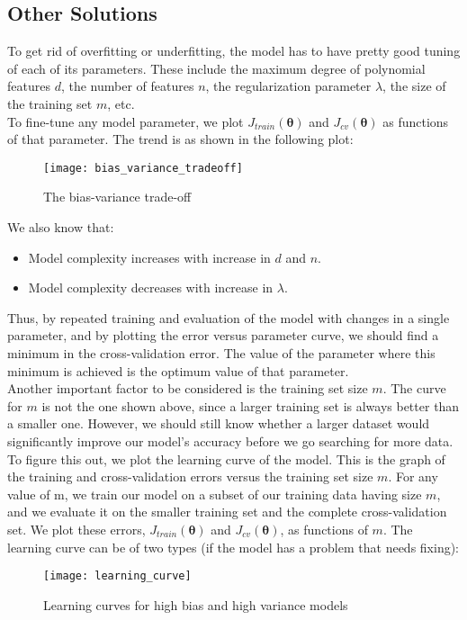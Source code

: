 \documentclass[a4paper, 12pt]{article}
\begin{document}
\subsection{Other Solutions}
To get rid of overfitting or underfitting, the model has to have pretty good tuning of each of its parameters. These include the maximum degree of polynomial features $d$, the number of features $n$, the regularization parameter $\lambda$, the size of the training set $m$, etc. \\
\break
To fine-tune any model parameter, we plot $J_{train}\left(\bm{\theta}\right)$ and $J_{cv}\left(\bm{\theta}\right)$ as functions of that parameter. The trend is as shown in the following plot:
\begin{figure}[H]
\centering
\texttt{[image: bias\_variance\_tradeoff]}
\caption{The bias-variance trade-off}
\end{figure}
We also know that:
\begin{itemize}
\item Model complexity increases with increase in $d$ and $n$.
\item Model complexity decreases with increase in $\lambda$.
\end{itemize}
Thus, by repeated training and evaluation of the model with changes in a single parameter, and by plotting the error versus parameter curve, we should find a minimum in the cross-validation error. The value of the parameter where this minimum is achieved is the optimum value of that parameter. \\
\break
Another important factor to be considered is the training set size $m$. The curve for $m$ is not the one shown above, since a larger training set is always better than a smaller one. However, we should still know whether a larger dataset would significantly improve our model's accuracy before we go searching for more data. \\
\break
To figure this out, we plot the learning curve of the model. This is the graph of the training and cross-validation errors versus the training set size $m$. For any value of m, we train our model on a subset of our training data having size $m$, and we evaluate it on the smaller training set and the complete cross-validation set. We plot these errors, $J_{train}\left(\bm{\theta}\right)$ and $J_{cv}\left(\bm{\theta}\right)$, as functions of $m$. The learning curve can be of two types (if the model has a problem that needs fixing):
\begin{figure}[H]
\centering
\texttt{[image: learning\_curve]}
\caption{Learning curves for high bias and high variance models}
\end{figure}
\end{document}
